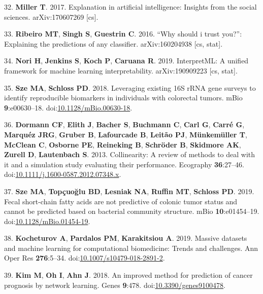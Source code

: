 \documentclass[11pt,]{article}
\begin{document}
\hypertarget{ref-miller_explanation_2017}{}
32. \textbf{Miller T}. 2017. Explanation in artificial intelligence:
Insights from the social sciences. arXiv:170607269 {[}cs{]}.

\hypertarget{ref-ribeiro_why_2016}{}
33. \textbf{Ribeiro MT}, \textbf{Singh S}, \textbf{Guestrin C}. 2016.
``Why should i trust you?'': Explaining the predictions of any
classifier. arXiv:160204938 {[}cs, stat{]}.

\hypertarget{ref-nori_interpretml:_2019}{}
34. \textbf{Nori H}, \textbf{Jenkins S}, \textbf{Koch P},
\textbf{Caruana R}. 2019. InterpretML: A unified framework for machine
learning interpretability. arXiv:190909223 {[}cs, stat{]}.

\hypertarget{ref-sze_leveraging_2018}{}
35. \textbf{Sze MA}, \textbf{Schloss PD}. 2018. Leveraging existing 16S
rRNA gene surveys to identify reproducible biomarkers in individuals
with colorectal tumors. mBio \textbf{9}:e00630--18.
doi:\href{https://doi.org/10.1128/mBio.00630-18}{10.1128/mBio.00630-18}.

\hypertarget{ref-dormann_collinearity:_2013}{}
36. \textbf{Dormann CF}, \textbf{Elith J}, \textbf{Bacher S},
\textbf{Buchmann C}, \textbf{Carl G}, \textbf{Carré G}, \textbf{Marquéz
JRG}, \textbf{Gruber B}, \textbf{Lafourcade B}, \textbf{Leitão PJ},
\textbf{Münkemüller T}, \textbf{McClean C}, \textbf{Osborne PE},
\textbf{Reineking B}, \textbf{Schröder B}, \textbf{Skidmore AK},
\textbf{Zurell D}, \textbf{Lautenbach S}. 2013. Collinearity: A review
of methods to deal with it and a simulation study evaluating their
performance. Ecography \textbf{36}:27--46.
doi:\href{https://doi.org/10.1111/j.1600-0587.2012.07348.x}{10.1111/j.1600-0587.2012.07348.x}.

\hypertarget{ref-sze_fecal_2019}{}
37. \textbf{Sze MA}, \textbf{Topçuoğlu BD}, \textbf{Lesniak NA},
\textbf{Ruffin MT}, \textbf{Schloss PD}. 2019. Fecal short-chain fatty
acids are not predictive of colonic tumor status and cannot be predicted
based on bacterial community structure. mBio \textbf{10}:e01454--19.
doi:\href{https://doi.org/10.1128/mBio.01454-19}{10.1128/mBio.01454-19}.

\hypertarget{ref-kocheturov_massive_2019}{}
38. \textbf{Kocheturov A}, \textbf{Pardalos PM}, \textbf{Karakitsiou A}.
2019. Massive datasets and machine learning for computational
biomedicine: Trends and challenges. Ann Oper Res \textbf{276}:5--34.
doi:\href{https://doi.org/10.1007/s10479-018-2891-2}{10.1007/s10479-018-2891-2}.

\hypertarget{ref-kim_improved_2018}{}
39. \textbf{Kim M}, \textbf{Oh I}, \textbf{Ahn J}. 2018. An improved
method for prediction of cancer prognosis by network learning. Genes
\textbf{9}:478.
doi:\href{https://doi.org/10.3390/genes9100478}{10.3390/genes9100478}.
\end{document}
